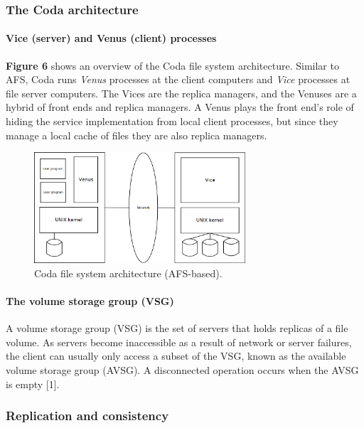 \subsubsection{The Coda architecture}

\paragraph{Vice (server) and Venus (client) processes}

\textbf{Figure 6} shows an overview of the Coda file system architecture. Similar to AFS, Coda runs \emph{Venus} processes at the client computers and \emph{Vice} processes at file server computers. The Vices are the replica managers, and the Venuses are a hybrid of front ends and replica managers. A Venus plays the front end's role of hiding the service implementation from local client processes, but since they manage a local cache of files they are also replica managers.

\begin{figure}
	\begin{center}
		\includegraphics[width=0.7\textwidth]{img/afs}
	\end{center}
	\caption{Coda file system architecture (AFS-based).}
	\label{fig:coda}
\end{figure}



\paragraph{The volume storage group (VSG)}

A volume storage group (VSG) is the set of servers that holds replicas of a file volume. As servers become inaccessible as a result of network or server failures, the client can usually only access a subset of the VSG, known as the available volume storage group (AVSG). A disconnected operation occurs when the AVSG is empty [1].



\subsubsection{Replication and consistency}

